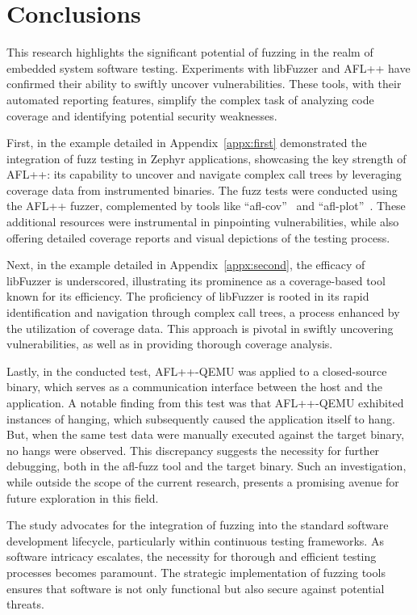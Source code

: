 \section{Conclusions}

This research highlights the significant potential of fuzzing in the realm of
embedded system software testing. Experiments with libFuzzer and AFL++ have
confirmed their ability to swiftly uncover vulnerabilities. These tools, with
their automated reporting features, simplify the complex task of analyzing code
coverage and identifying potential security weaknesses.

First, in the example detailed in Appendix~\ref{appx:first} demonstrated the
integration of fuzz testing in Zephyr applications,
showcasing the key strength of AFL++: its capability to uncover and navigate
complex call trees by leveraging coverage data from instrumented binaries. The
fuzz tests were conducted using the AFL++ fuzzer, complemented by tools like
``afl-cov''~\cite{GitHubmr91:online} and ``afl-plot''~\cite{AFLFunct92:online}.
These additional resources were instrumental in pinpointing vulnerabilities,
while also offering detailed coverage reports and visual depictions of the testing process.

Next, in the example detailed in Appendix~\ref{appx:second}, the efficacy of libFuzzer
is underscored, illustrating its prominence as a coverage-based tool known for
its efficiency. The proficiency of libFuzzer is rooted in its rapid
identification and navigation through complex call trees, a process enhanced by
the utilization of coverage data. This approach is pivotal in swiftly uncovering
vulnerabilities, as well as in providing thorough coverage analysis.

Lastly, in the conducted test, AFL++-QEMU was applied to a closed-source binary,
which serves as a communication interface between the host and the application.
A notable finding from this test was that AFL++-QEMU exhibited instances of
hanging, which subsequently caused the application itself to hang. But, when the same test data
were manually executed against the target binary, no hangs
were observed. This discrepancy suggests the necessity for further debugging,
both in the afl-fuzz tool and the target binary. Such an investigation, while
outside the scope of the current research, presents a promising avenue for
future exploration in this field.

The study advocates for the integration of fuzzing into the standard software
development lifecycle, particularly within continuous testing frameworks. As
software intricacy escalates, the necessity for thorough and efficient testing
processes becomes paramount. The strategic implementation of fuzzing tools
ensures that software is not only functional but also secure against potential
threats.


